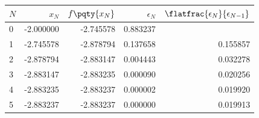 \begin{tabular}{lrrrr}
\toprule
\(N\) & \(x_N\) & \(f\pqty{x_N}\) & \(\epsilon_N\) & \(\flatfrac{\epsilon_N}{\epsilon_{N - 1}}\) \\
\midrule
0 & -2.000000 & -2.745578 & 0.883237 & \\
1 & -2.745578 & -2.878794 & 0.137658 & 0.155857 \\
2 & -2.878794 & -2.883147 & 0.004443 & 0.032278 \\
3 & -2.883147 & -2.883235 & 0.000090 & 0.020256 \\
4 & -2.883235 & -2.883237 & 0.000002 & 0.019920 \\
5 & -2.883237 & -2.883237 & 0.000000 & 0.019913 \\
\bottomrule
\end{tabular}
